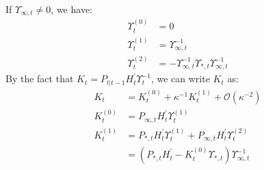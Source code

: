 \documentclass[10pt]{article}
\numberwithin{equation}{section}
\begin{document}
If $\Upsilon_{\infty,t}\neq 0$, we have:
\begin{align*}
    \Upsilon_t^{(0)} &= 0 \\
    \Upsilon_t^{(1)} &= \Upsilon_{\infty,t}^{-1} \\
    \Upsilon_t^{(2)} &= -\Upsilon_{\infty,t}^{-1}\Upsilon_{*,t}\Upsilon_{\infty,t}^{-1}
\end{align*}
By the fact that $K_t = P_{t|t-1}H_t^{'}\Upsilon_t^{-1}$, we can write $K_t$ as:
\begin{align}
    K_t &= K_t^{(0)} + \kappa^{-1}K_t^{(1)} + \mathcal{O}(\kappa^{-2}) \label{eq:K1_diffuse_start} \\
    K_t^{(0)} &= P_{\infty,t}H_t^{'}\Upsilon_t^{(1)} \\
    K_t^{(1)} &= P_{*,t}H_t^{'}\Upsilon_t^{(1)} + P_{\infty,t}H_t^{'}\Upsilon_t^{(2)} \nonumber \\
    &= (P_{*,t}H_t^{'}-K_t^{(0)}\Upsilon_{*,t})\Upsilon_{\infty,t}^{-1} \label{eq:K1_diffuse_end}
\end{align}
\end{document}

